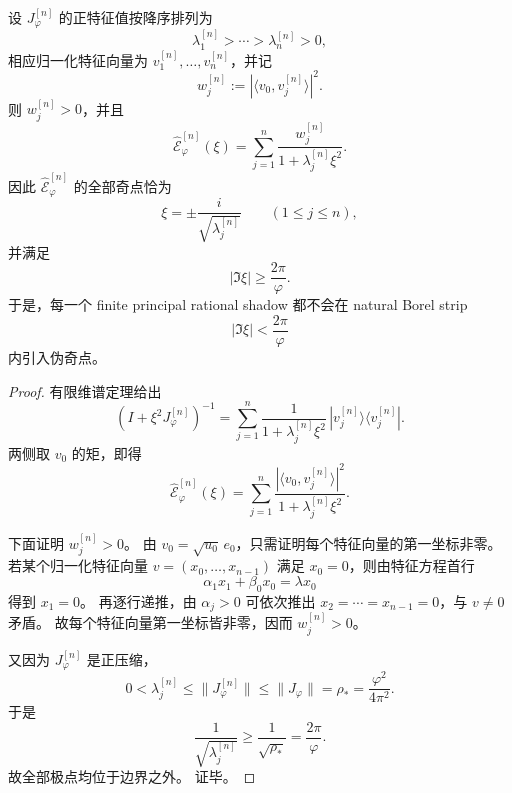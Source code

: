 \begin{proposition}\label{prop:xi-time-part9zbi-principal-rational-shadow-natural-strip}
设 \(J_\varphi^{[n]}\) 的正特征值按降序排列为
\[
\lambda_1^{[n]}>\cdots>\lambda_n^{[n]}>0,
\]
相应归一化特征向量为 \(v_1^{[n]},\dots,v_n^{[n]}\)，并记
\[
w_j^{[n]}:=|\langle v_0,v_j^{[n]}\rangle|^2.
\]
则 \(w_j^{[n]}>0\)，并且
\[
\widehat{\mathcal E}_\varphi^{[n]}(\xi)
=
\sum_{j=1}^{n}\frac{w_j^{[n]}}{1+\lambda_j^{[n]}\xi^2}.
\]
因此 \(\widehat{\mathcal E}_\varphi^{[n]}\) 的全部奇点恰为
\[
\xi=\pm \frac{i}{\sqrt{\lambda_j^{[n]}}}
\qquad (1\le j\le n),
\]
并满足
\[
|\Im \xi|\ge \frac{2\pi}{\varphi}.
\]
于是，每一个 finite principal rational shadow 都不会在 natural Borel strip
\[
|\Im \xi|<\frac{2\pi}{\varphi}
\]
内引入伪奇点。
\end{proposition}
\begin{proof}
有限维谱定理给出
\[
(I+\xi^2J_\varphi^{[n]})^{-1}
=
\sum_{j=1}^{n}\frac{1}{1+\lambda_j^{[n]}\xi^2}
\,
|v_j^{[n]}\rangle\langle v_j^{[n]}|.
\]
两侧取 \(v_0\) 的矩，即得
\[
\widehat{\mathcal E}_\varphi^{[n]}(\xi)
=
\sum_{j=1}^{n}\frac{|\langle v_0,v_j^{[n]}\rangle|^2}{1+\lambda_j^{[n]}\xi^2}.
\]

下面证明 \(w_j^{[n]}>0\)。
由 \(v_0=\sqrt{u_0}\,e_0\)，只需证明每个特征向量的第一坐标非零。
若某个归一化特征向量 \(v=(x_0,\dots,x_{n-1})\) 满足 \(x_0=0\)，则由特征方程首行
\[
\alpha_1 x_1+\beta_0 x_0=\lambda x_0
\]
得到 \(x_1=0\)。
再逐行递推，由 \(\alpha_j>0\) 可依次推出 \(x_2=\cdots=x_{n-1}=0\)，与 \(v\neq 0\) 矛盾。
故每个特征向量第一坐标皆非零，因而 \(w_j^{[n]}>0\)。

又因为 \(J_\varphi^{[n]}\) 是正压缩，
\[
0<\lambda_j^{[n]}\le \|J_\varphi^{[n]}\|\le \|J_\varphi\|=\rho_\ast=\frac{\varphi^2}{4\pi^2}.
\]
于是
\[
\frac{1}{\sqrt{\lambda_j^{[n]}}}
\ge
\frac{1}{\sqrt{\rho_\ast}}
=
\frac{2\pi}{\varphi}.
\]
故全部极点均位于边界之外。
证毕。
\end{proof}

